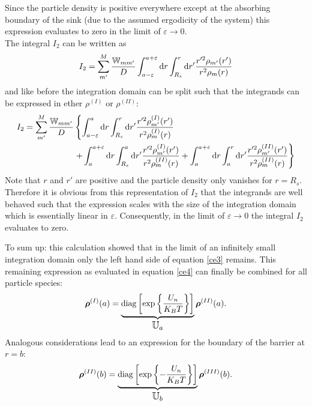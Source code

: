 Since the particle density is positive everywhere except at the absorbing boundary of the sink (due to the assumed ergodicity of the system) this expression evaluates to zero in the limit of $\varepsilon \rightarrow 0$. \\
The integral $I_2$ can be written as
\begin{equation}
    I_2 = \sum_{m'}^M\frac{\mathbb{W}_{mm'}}{D} \int_{a-\varepsilon}^{a+\varepsilon} {\rm d} r \int_{R_s}^{r} {\rm d} r' \frac{r'^2 \rho_{m'}(r')}{r^2\rho_m(r)}
    \label{ce7}
\end{equation}
and like before the integration domain can be split such that the integrands can be expressed in ether $\rho^{(I)}$ or $\rho^{(II)}$:
\begin{align}
    I_2 = \sum_{m'}^M\frac{\mathbb{W}_{mm'}}{D} & \left\{ \int_{a-\varepsilon}^{a} {\rm d} r \int_{R_s}^{r} {\rm d} r' \frac{r'^2 \rho^{(I)}_{m'}(r')}{r^2\rho^{(I)}_m(r)} \right. \nonumber \\ 
    &\left. + \int_{a}^{a+\varepsilon} {\rm d} r \int_{R_s}^{a} {\rm d} r' \frac{r'^2 \rho^{(I)}_{m'}(r')}{r^2\rho^{(II)}_m(r)} + \int_{a}^{a+\varepsilon} {\rm d} r \int_{a}^{r} {\rm d} r' \frac{r'^2 \rho^{(II)}_{m'}(r')}{r^2\rho^{(II)}_m(r)} \right\}
    \label{ce8}
\end{align}
Note that $r$ and $r'$ are positive and the particle density only vanishes for $r=R_s$. Therefore it is obvious from this representation of $I_2$ that the integrands are well behaved such that the expression scales with the size of the integration domain which is essentially linear in $\varepsilon$. Consequently, in the limit of $\varepsilon \rightarrow 0$ the integral $I_2$ evaluates to zero.
\par
To sum up: this calculation showed that in the limit of an infinitely small integration domain only the left hand side of equation \eqref{ce3} remains. This remaining expression as evaluated in equation \eqref{ce4} can finally be combined for all particle species:
\begin{equation}
    \boldsymbol{\mathbf{\rho}}^{(I)}(a) = \underbrace{ {\rm diag}\left[\exp\left\{\frac{U_n}{K_B T} \right\}\right]}_\text{\large$\mathbb{U}_a$} \boldsymbol{\mathbf{\rho}}^{(II)}(a).
    \label{dens_fit}
\end{equation}
Analogous considerations lead to an expression for the boundary of the barrier at $r=b$:
\begin{equation}
     \boldsymbol{\mathbf{\rho}}^{(II)}(b) = \underbrace{ {\rm diag}\left[\exp\left\{-\frac{U_n}{K_B T} \right\}\right]}_\text{\large$\mathbb{U}_b$} \boldsymbol{\mathbf{\rho}}^{(III)}(b).
    \label{dens_fit_b}
\end{equation}
